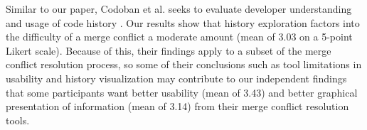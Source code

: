 Similar to our paper, Codoban et al. seeks to evaluate developer understanding and usage of code history \cite{mihai_lenses}. Our results show that history exploration factors into the difficulty of a merge conflict a moderate amount (mean of 3.03 on a 5-point Likert scale). Because of this, their findings apply to a subset of the merge conflict resolution process, so some of their conclusions such as tool limitations in usability and history visualization may contribute to our independent findings that some participants want better usability (mean of 3.43) and better graphical presentation of information (mean of 3.14) from their merge conflict resolution tools.